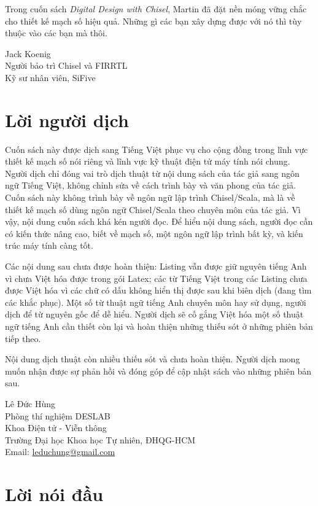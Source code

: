 \documentclass[%
    10pt,
    headinclude, footexclude,
    openright, %
    notitlepage,
    cleardoubleempty,
    headsepline,
    pointlessnumbers,
    bibtotoc, idxtotoc,
    ]{scrbook}
\begin{document}
Trong cuốn sách \emph{Digital Design with Chisel}, Martin đã đặt nền móng vững chắc cho thiết kế mạch số hiệu quả. Những gì các bạn xây dựng được với nó thì tùy thuộc vào các bạn mà thôi. 

\medskip
\noindent Jack Koenig\\
Người bảo trì Chisel và FIRRTL\\
Kỹ sư nhân viên, SiFive

\chapter{Lời người dịch}

\medskip
\medskip

Cuốn sách này được dịch sang Tiếng Việt phục vụ cho cộng đồng trong lĩnh vực thiết kế mạch số nói riêng và lĩnh vực kỹ thuật điện tử máy tính nói chung. Người dịch chỉ đóng vai trò dịch thuật từ nội dung sách của tác giả sang ngôn ngữ Tiếng Việt, không chỉnh sửa về cách trình bày và văn phong của tác giả. Cuốn sách này không trình bày về ngôn ngữ lập trình Chisel/Scala, mà là về thiết kế mạch số dùng ngôn ngữ Chisel/Scala theo chuyên môn của tác giả. Vì vậy, nội dung cuốn sách khá kén người đọc. Để hiểu nội dung sách, người đọc cần có kiến thức nâng cao, biết về mạch số, một ngôn ngữ lập trình bất kỳ, và kiến trúc máy tính càng tốt. 

Các nội dung sau chưa được hoàn thiện: Listing vẫn được giữ nguyên tiếng Anh vì chưa Việt hóa được trong gói Latex; các từ Tiếng Việt trong các Listing chưa được Việt hóa vì các chữ có dấu không hiển thị được sau khi biên dịch (đang tìm các khắc phục). Một số từ thuật ngữ tiếng Anh chuyên môn hay sử dụng, người dịch để từ nguyên gốc để dễ hiểu. Người dịch sẽ cố gắng Việt hóa một số thuật ngữ tiếng Anh cần thiết còn lại và hoàn thiện những thiếu sót ở những phiên bản tiếp theo.

Nội dung dịch thuật còn nhiều thiếu sót và chưa hoàn thiện. Người dịch mong muốn nhận được sự phản hồi và đóng góp để cập nhật sách vào những phiên bản sau.

\medskip
\noindent Lê Đức Hùng\\
Phòng thí nghiệm DESLAB\\
Khoa Điện tử - Viễn thông\\
Trường Đại học Khoa học Tự nhiên, ĐHQG-HCM \\
Email: \url{leduchung@gmail.com}\\

\chapter{Lời nói đầu}
\end{document}
